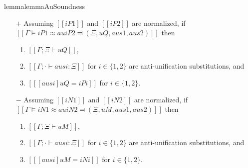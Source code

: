 \begin{restatable}{lemma}{lemmaAuSoundness}
    \label{lemma:au-soundness}
    \hfill
    \begin{itemize}
        \item [$+$]  Assuming $[[iP1]]$ and $[[iP2]]$ are normalized,
        if $[[Γ ⊨ iP1 ≈au iP2 ⫤ (Ξ, uQ, aus1, aus2)]]$
        then 
        \begin{enumerate}
            \item $[[Γ ; Ξ ⊢ uQ]]$,
            \item $[[Γ ; · ⊢ ausi : Ξ]]$ for $i \in \{1,2\}$
            are anti-unification substitutions, and
            \item $[[ [ausi] uQ = iPi ]]$ for $i \in \{1,2\}$.
        \end{enumerate}

        \item [$-$] Assuming $[[iN1]]$ and $[[iN2]]$ are normalized,
        if $[[Γ ⊨ iN1 ≈au iN2 ⫤ (Ξ, uM, aus1, aus2)]]$
        then
        \begin{enumerate}
            \item $[[Γ ; Ξ ⊢ uM]]$,
            \item $[[Γ ; · ⊢ ausi : Ξ]]$ for $i \in \{1,2\}$
            are anti-unification substitutions, and
            \item $[[ [ausi] uM = iNi ]]$ for $i \in \{1,2\}$.
        \end{enumerate}
    \end{itemize}
\end{restatable}


